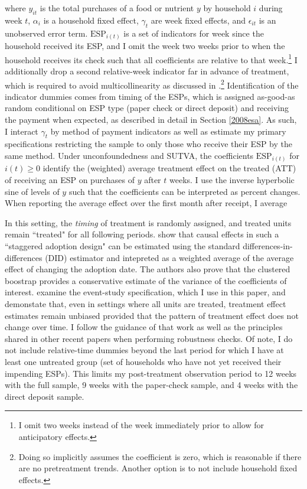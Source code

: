 \documentclass[12pt]{article}
\begin{document}
where $y_{it}$ is the total purchases of a food or nutrient $y$ by household $i$ during week $t$, $\alpha_i$ is a household fixed effect, $\gamma_t$ are week fixed effects, and $\epsilon_{it}$ is an unobserved error term.
$\text{ESP}_{i(t)}$ is a set of indicators for week since the household received its ESP, and I omit the week two weeks prior to when the household receives its check such that all coefficients are relative to that week.\footnote{I omit two weeks instead of the week immediately prior to allow for anticipatory effects.} I additionally drop a second relative-week indicator far in advance of treatment, which is required to avoid multicollinearity as discussed in \textcite{borusyak2017revisiting}.\footnote{Doing so implicitly assumes the coefficient is zero, which is reasonable if there are no pretreatment trends.
Another option is to not include household fixed effects.} Identification of the indicator dummies comes from timing of the ESPs, which is assigned as-good-as random conditional on ESP type (paper check or direct deposit) and receiving the payment when expected, as described in detail in Section \ref{2008esa}.
As such, I interact $\gamma_t$ by method of payment indicators as well as estimate my primary specifications restricting the sample to only those who receive their ESP by the same method.
Under unconfoundedness and SUTVA, the coefficients $\text{ESP}_{i(t)}$ for $i(t) \geq 0$ identify the (weighted) average treatment effect on the treated (ATT) of receiving an ESP on purchases of $y$ after $t$ weeks.
I use the inverse hyperbolic sine of levels of $y$ such that the coefficients can be interpreted as percent changes.
When reporting the average effect over the first month after receipt, I average %

In this setting, the \textit{timing} of treatment is randomly assigned, and treated units remain ``treated" for all following periods.
\textcite{athey2021design} show that causal effects in such a ``staggered adoption design" can be estimated using the standard differences-in-differences (DID) estimator and intepreted as a weighted average of the average effect of changing the adoption date.
The authors also prove that the clustered boostrap provides a conservative estimate of the variance of the coefficients of interest.
\textcite{sun2020estimating} examine the event-study specification, which I use in this paper, and demonstate that, even in settings where all units are treated, treatment effect estimates remain unbiased provided that the pattern of treatment effect does not change over time.
I follow the guidance of that work as well as the principles shared in other recent papers \parencite{goodman2018difference, callaway2020difference, de2020two} when performing robustness checks.
Of note, I do not include relative-time dummies beyond the last period for which I have at least one untreated group (set of households who have not yet received their impending ESPs).
This limits my post-treatment observation period to 12 weeks with the full sample, 9 weeks with the paper-check sample, and 4 weeks with the direct deposit sample.
\end{document}

